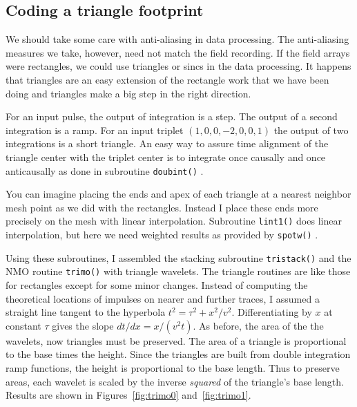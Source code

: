 
\subsection{Coding a triangle footprint}
\par
We should take some care with anti-aliasing in data processing.
The anti-aliasing measures we take, however,
need not match the field recording.
If the field arrays were rectangles,
we could use triangles or sincs in the data processing.
It happens that triangles are an easy extension
of the rectangle work that we have been doing
and triangles make a big step in the right direction.

\par
For an input pulse,
the output of integration is a step.
The output of a second integration is a ramp.
For an input triplet $(1, 0, 0, -2, 0, 0, 1)$
the output of two integrations is a short triangle.
An easy way to assure time alignment
of the triangle center with
the triplet center is to integrate
once causally and once anticausally
as done in subroutine \texttt{doubint()} .

\par
You can imagine placing the ends and apex of each triangle
at a nearest neighbor mesh point as we did with the rectangles.
Instead I place these ends more precisely on the mesh with
linear interpolation.
Subroutine \texttt{lint1()}  does linear interpolation,
but here we need weighted results
as provided by \texttt{spotw()} .

\par
Using these subroutines,
I assembled the stacking subroutine {\tt tristack()}
and the NMO routine {\tt trimo()} with triangle wavelets.
The triangle routines are like those for rectangles
except for some minor changes.
Instead of computing the theoretical locations
of impulses on nearer and further traces,
I assumed a straight line tangent to the hyperbola
$t^2 = \tau^2+x^2/v^2$.
Differentiating by $x$ at constant $\tau$ gives the slope
$dt/dx= x/(v^2t)$.
As before, the area of the the wavelets, now triangles must be preserved.
The area of a triangle is proportional to the base times the height.
Since the triangles are built from double integration ramp functions,
the height is proportional to the base length.
Thus to preserve areas, each wavelet is scaled by the inverse {\em  squared}
of the triangle's base length.
Results are shown in
Figures~\ref{fig:trimo0} and~\ref{fig:trimo1}.

